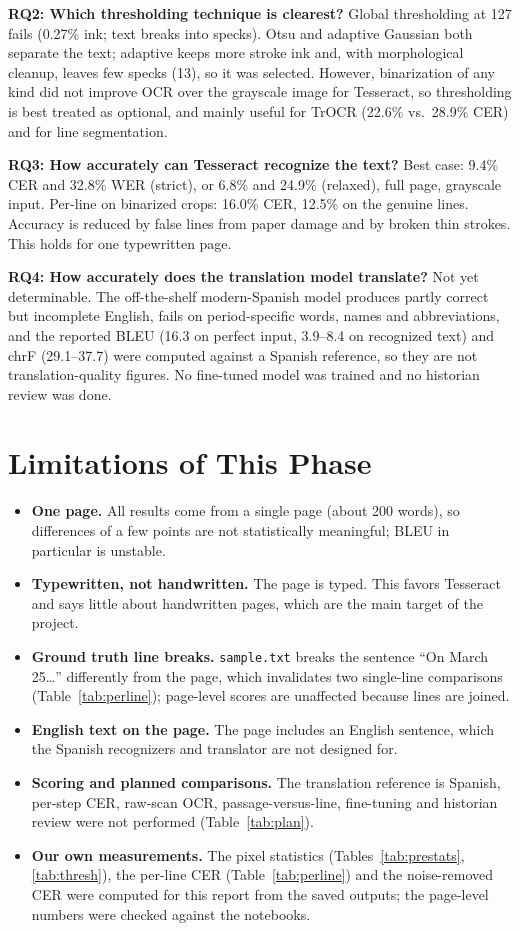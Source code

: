 \documentclass[10pt,twocolumn]{article}
\newcommand{\sample}{\texttt{sample.txt}}
\begin{document}
\textbf{RQ2: Which thresholding technique is clearest?} Global thresholding at 127 fails (0.27\% ink; text breaks into specks). Otsu and adaptive Gaussian both separate the text; adaptive keeps more stroke ink and, with morphological cleanup, leaves few specks (13), so it was selected. However, binarization of any kind did not improve OCR over the grayscale image for Tesseract, so thresholding is best treated as optional, and mainly useful for TrOCR (22.6\% vs.\ 28.9\% CER) and for line segmentation.

\textbf{RQ3: How accurately can Tesseract recognize the text?} Best case: 9.4\% CER and 32.8\% WER (strict), or 6.8\% and 24.9\% (relaxed), full page, grayscale input. Per-line on binarized crops: 16.0\% CER, 12.5\% on the genuine lines. Accuracy is reduced by false lines from paper damage and by broken thin strokes. This holds for one typewritten page.

\textbf{RQ4: How accurately does the translation model translate?} Not yet determinable. The off-the-shelf modern-Spanish model produces partly correct but incomplete English, fails on period-specific words, names and abbreviations, and the reported BLEU (16.3 on perfect input, 3.9--8.4 on recognized text) and chrF (29.1--37.7) were computed against a Spanish reference, so they are not translation-quality figures. No fine-tuned model was trained and no historian review was done.

\section{Limitations of This Phase}
\begin{itemize}
  \item \textbf{One page.} All results come from a single page (about 200 words), so differences of a few points are not statistically meaningful; BLEU in particular is unstable.
  \item \textbf{Typewritten, not handwritten.} The page is typed. This favors Tesseract and says little about handwritten pages, which are the main target of the project.
  \item \textbf{Ground truth line breaks.} \sample{} breaks the sentence ``On March 25\ldots'' differently from the page, which invalidates two single-line comparisons (Table~\ref{tab:perline}); page-level scores are unaffected because lines are joined.
  \item \textbf{English text on the page.} The page includes an English sentence, which the Spanish recognizers and translator are not designed for.
  \item \textbf{Scoring and planned comparisons.} The translation reference is Spanish, per-step CER, raw-scan OCR, passage-versus-line, fine-tuning and historian review were not performed (Table~\ref{tab:plan}).
  \item \textbf{Our own measurements.} The pixel statistics (Tables~\ref{tab:prestats}, \ref{tab:thresh}), the per-line CER (Table~\ref{tab:perline}) and the noise-removed CER were computed for this report from the saved outputs; the page-level numbers were checked against the notebooks.
\end{itemize}
\end{document}
